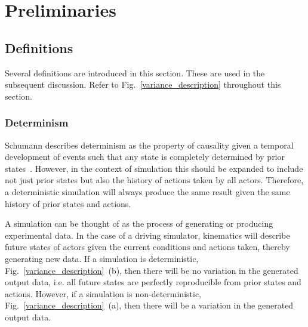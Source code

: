 \documentclass[letterpaper, 10 pt, journal, twoside]{IEEEtran}
\begin{document}

\section{Preliminaries} \label{s:prelim}

\subsection{Definitions}

Several definitions are introduced in this section. These are used in the subsequent discussion. Refer to Fig.~\ref{variance_description} throughout this section.
\\

\subsubsection{Determinism}
Schumann describes determinism as the property of causality given a temporal development of events such that any state is completely determined by prior states~\cite{Schumann2010}. However, in the context of simulation this should be expanded to include not just prior states but also the history of actions taken by all actors. Therefore, a deterministic simulation will always produce the same result given the same history of prior states and actions.
% 

A simulation can be thought of as the process of generating or producing experimental data. 
%
In the case of a driving simulator, kinematics will describe future states of actors given the current conditions and actions taken, thereby generating new data. 
%
If a simulation is deterministic, Fig.~\ref{variance_description}~(b), then there will be no variation in the generated output data, i.e. all future states are perfectly reproducible from prior states and actions. 
%
However, if a simulation is non-deterministic, Fig.~\ref{variance_description}~(a), then there will be a variation in the generated output data. \\
\end{document}
